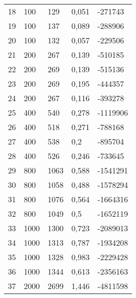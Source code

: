 \begin{longtable}{lllll}
    18               & 100            & 129            & 0,051       & -271743         \\
    19               & 100            & 137            & 0,089       & -288906         \\
    20               & 100            & 132            & 0,057       & -229506         \\
    21               & 200            & 267            & 0,139       & -510185         \\
    22               & 200            & 269            & 0,139       & -515136         \\
    23               & 200            & 269            & 0,195       & -444357         \\
    24               & 200            & 267            & 0,116       & -393278         \\
    25               & 400            & 540            & 0,278       & -1119906        \\
    26               & 400            & 518            & 0,271       & -788168         \\
    27               & 400            & 538            & 0,2         & -895704         \\
    28               & 400            & 526            & 0,246       & -733645         \\
    29               & 800            & 1063           & 0,588       & -1541291        \\
    30               & 800            & 1058           & 0,488       & -1578294        \\
    31               & 800            & 1076           & 0,564       & -1664316        \\
    32               & 800            & 1049           & 0,5         & -1652119        \\
    33               & 1000           & 1300           & 0,723       & -2089013        \\
    34               & 1000           & 1313           & 0,787       & -1934208        \\
    35               & 1000           & 1328           & 0,983       & -2229428        \\
    36               & 1000           & 1344           & 0,613       & -2356163        \\
    37               & 2000           & 2699           & 1,446       & -4811598        \\

\end{longtable}
